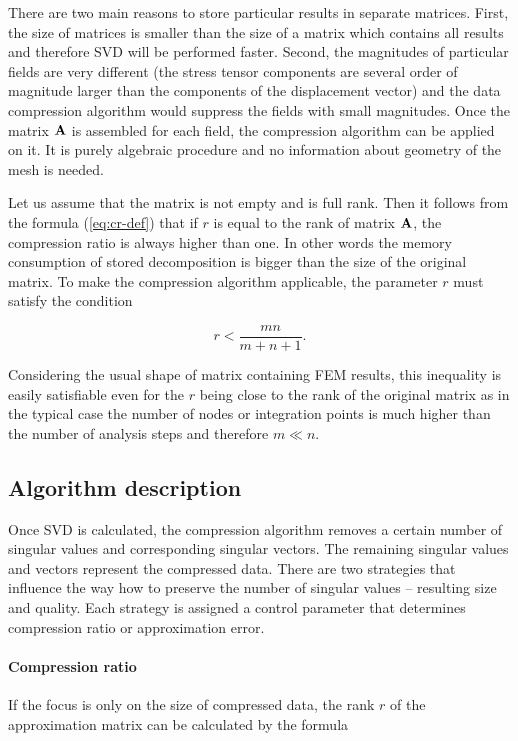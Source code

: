 There are two main reasons to store particular results in separate matrices. First, the size of matrices is smaller than the size of a matrix which contains all results and therefore SVD will be performed faster. Second, the magnitudes of particular fields are very different (the stress tensor components are several order of magnitude larger than the components of the displacement vector) and the data compression algorithm would suppress the fields with small magnitudes. Once the matrix $\mathbf{A}$ is assembled for each field, the compression algorithm can be applied on it. It is purely algebraic procedure and no information about geometry of the mesh is needed.

Let us assume that the matrix is not empty and is full rank. Then it follows from the formula (\ref{eq:cr-def}) that if $r$ is equal to the rank of matrix $\mathbf{A}$, the compression ratio is always higher than one. In other words the memory consumption of stored decomposition is bigger than the size of the original matrix. To make the compression algorithm applicable, the parameter $r$ must satisfy the condition

\begin{equation}
r<\frac{m n}{m+n+1}.
\label{eq:r-ineq}
\end{equation}

\noindent
Considering the usual shape of matrix containing FEM results, this inequality is easily satisfiable even for the $r$ being close to the rank of the original matrix as in the typical case the number of nodes or integration points is much higher than the number of analysis steps and therefore $m \ll n$.

\subsection{Algorithm description}
Once SVD is calculated, the compression algorithm removes a certain number of singular values and corresponding singular vectors. The remaining singular values and vectors represent the compressed data. There are two strategies that influence the way how to preserve the number of singular values -- resulting size and quality. Each strategy is assigned a control parameter that determines compression ratio or approximation error.

\paragraph{Compression ratio}
If the focus is only on the size of compressed data, the rank $r$ of the approximation matrix can be calculated by the formula


